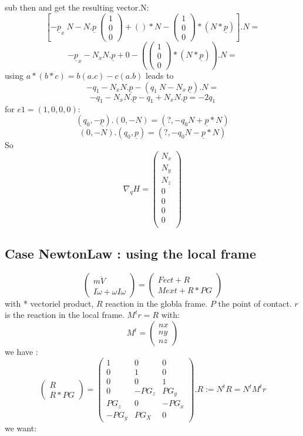 sub then and get the resulting vector.N:
\[\left[ -\underline p_x~N -N.\underline p~\left(\begin{array}{c}1\\0\\0\end{array}\right)+()*N-\left(\begin{array}{c}1\\0\\0\end{array}\right)*(N*\underline p)\right].N=\]
\[-\underline p_x-N_xN.\underline p+0-(\left(\begin{array}{c}1\\0\\0\end{array}\right)*(N*\underline p)).N=\]
  using $a*(b*c)=b(a.c)-c(a.b)$ leads to
  \[-q_1-N_xN.\underline p-(q_1~N-N_x~\underline p).N=\]
\[-q_1-N_xN.\underline p-q_1+N_xN.\underline p=-2q_1\]
for $e1=(1,0,0,0)$:
\[(q_0,-\underline p).(0,-N)=(?,-q_0N+\underline p*N)\]
\[(0,-N).(q_0,\underline p)=(?,-q_0N-\underline p*N)\]
So
\[\nabla _q H =\left(\begin{array}{c} N_x\\N_y\\N_z\\
0\\
0\\
0\\
0\\
\end{array}\right)\]


\subsection{Case NewtonLaw : using the local frame}

\[\left(\begin{array}{c}m \dot V\\I \dot \omega + \omega I \omega \end{array}\right)= \left(\begin{array}{c}Fect+R\\Mext + R*PG \end{array}\right)\]
  with * vectoriel product, $R$ reaction in the globla frame. $P$ the point of contact.
  $r$ is the reaction in the local frame.  $M^t r=R$ with:
  \[M^t=\left(\begin{array}{c} nx \\ny\\nz \end{array}\right)\]
  we have :
  \[\left(\begin{array}{c}R\\R*PG\end{array}\right)=\left(\begin{array}{ccc} 1&0&0\\0&1&0\\0&0&1\\
      0&-PG_z&PG_y\\PG_z&0&-PG_x\\-PG_y&PG_X&0\end{array}\right).R:=N^tR=N^tM^tr\]
      we want:
      
